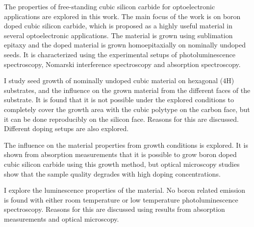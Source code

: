 The properties of free-standing cubic silicon carbide for optoelectronic applications are explored in this work. The main focus of the work is on boron doped cubic silicon carbide, which is proposed as a highly useful material in several optoelectronic applications. The material is grown using sublimation epitaxy and the doped material is grown homoepitaxially on nominally undoped seeds. It is characterized using the experimental setups of photoluminescence spectroscopy, Nomarski interference spectroscopy and absorption spectroscopy. 

I study seed growth of nominally undoped cubic material on hexagonal (4H) substrates, and the influence on the grown material from the different faces of the substrate. It is found that it is not possible under the explored conditions to completely cover the growth area with the cubic polytype on the carbon face, but it can be done reproducibly on the silicon face. Reasons for this are discussed. Different doping setups are also explored.

The influence on the material properties from growth conditions is explored. It is shown from absorption measurements that it is possible to grow boron doped cubic silicon carbide using this growth method, but optical microscopy studies show that the sample quality degrades with high doping concentrations. 

I explore the luminescence properties of the material. No boron related emission is found with either room temperature or low temperature photoluminescence spectroscopy. Reasons for this are discussed using results from absorption measurements and optical microscopy. 

